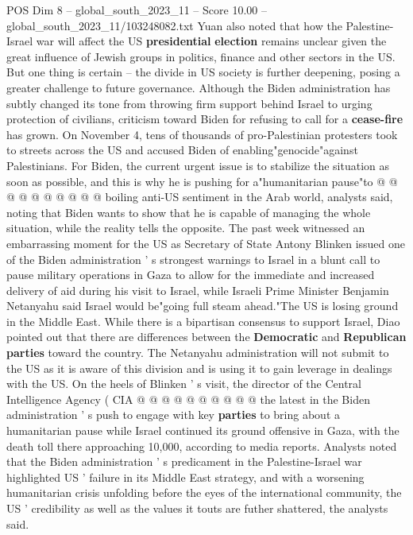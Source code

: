 \begin{textsample}{POS Dim 8 – global\_south\_2023\_11 – Score 10.00 – global\_south\_2023\_11/103248082.txt}
Yuan also noted that how the Palestine-Israel war will affect the US \textbf{presidential} \textbf{election} remains unclear given the great influence of Jewish groups in politics, finance and other sectors in the US.
But one thing is certain -- the divide in US society is further deepening, posing a greater challenge to future governance.
Although the Biden administration has subtly changed its tone from throwing firm support behind Israel to urging protection of civilians, criticism toward Biden for refusing to call for a \textbf{cease-fire} has grown.
On November 4, tens of thousands of pro-Palestinian protesters took to streets across the US and accused Biden of enabling"genocide"against Palestinians.
For Biden, the current urgent issue is to stabilize the situation as soon as possible, and this is why he is pushing for a"humanitarian pause"to @ @ @ @ @ @ @ @ @ @ boiling anti-US sentiment in the Arab world, analysts said, noting that Biden wants to show that he is capable of managing the whole situation, while the reality tells the opposite.
The past week witnessed an embarrassing moment for the US as Secretary of State Antony Blinken issued one of the Biden administration ' s strongest warnings to Israel in a blunt call to pause military operations in Gaza to allow for the immediate and increased delivery of aid during his visit to Israel, while Israeli Prime Minister Benjamin Netanyahu said Israel would be"going full steam ahead."The US is losing ground in the Middle East.
While there is a bipartisan consensus to support Israel, Diao pointed out that there are differences between the \textbf{Democratic} and \textbf{Republican} \textbf{parties} toward the country.
The Netanyahu administration will not submit to the US as it is aware of this division and is using it to gain leverage in dealings with the US.
On the heels of Blinken ' s visit, the director of the Central Intelligence Agency ( CIA @ @ @ @ @ @ @ @ @ @ the latest in the Biden administration ' s push to engage with key \textbf{parties} to bring about a humanitarian pause while Israel continued its ground offensive in Gaza, with the death toll there approaching 10,000, according to media reports.
Analysts noted that the Biden administration ' s predicament in the Palestine-Israel war highlighted US ' failure in its Middle East strategy, and with a worsening humanitarian crisis unfolding before the eyes of the international community, the US ' credibility as well as the values it touts are futher shattered, the analysts said.

\end{textsample}
